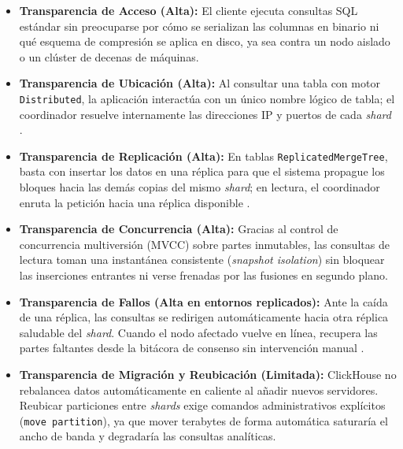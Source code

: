 \documentclass[12pt,a4paper]{article}
\begin{document}
\begin{itemize}[leftmargin=1.2cm]
    \item \textbf{Transparencia de Acceso (Alta):} El cliente ejecuta consultas SQL estándar sin preocuparse por cómo se serializan las columnas en binario ni qué esquema de compresión se aplica en disco, ya sea contra un nodo aislado o un clúster de decenas de máquinas.
    \item \textbf{Transparencia de Ubicación (Alta):} Al consultar una tabla con motor \texttt{Distributed}, la aplicación interactúa con un único nombre lógico de tabla; el coordinador resuelve internamente las direcciones IP y puertos de cada \textit{shard} \cite{vansteen2023distributed}.
    \item \textbf{Transparencia de Replicación (Alta):} En tablas \texttt{ReplicatedMergeTree}, basta con insertar los datos en una réplica para que el sistema propague los bloques hacia las demás copias del mismo \textit{shard}; en lectura, el coordinador enruta la petición hacia una réplica disponible \cite{han2024palf}.
    \item \textbf{Transparencia de Concurrencia (Alta):} Gracias al control de concurrencia multiversión (MVCC) sobre partes inmutables, las consultas de lectura toman una instantánea consistente (\textit{snapshot isolation}) sin bloquear las inserciones entrantes ni verse frenadas por las fusiones en segundo plano.
    \item \textbf{Transparencia de Fallos (Alta en entornos replicados):} Ante la caída de una réplica, las consultas se redirigen automáticamente hacia otra réplica saludable del \textit{shard}. Cuando el nodo afectado vuelve en línea, recupera las partes faltantes desde la bitácora de consenso sin intervención manual \cite{han2024palf}.
    \item \textbf{Transparencia de Migración y Reubicación (Limitada):} ClickHouse no rebalancea datos automáticamente en caliente al añadir nuevos servidores. Reubicar particiones entre \textit{shards} exige comandos administrativos explícitos (\texttt{move partition}), ya que mover terabytes de forma automática saturaría el ancho de banda y degradaría las consultas analíticas.
\end{itemize}
\end{document}
